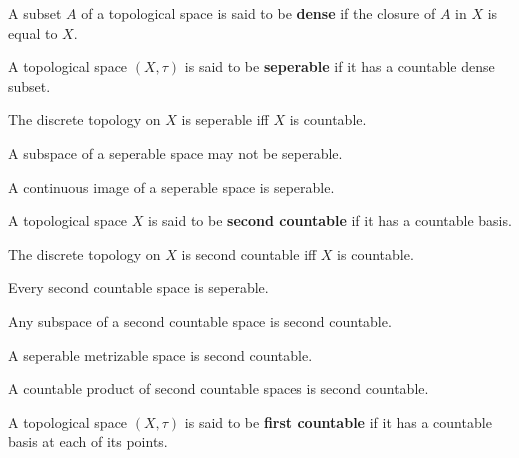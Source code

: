 \begin{defn}
    A subset $A$ of a topological space is said to be \textbf{dense} if the closure of $A$ in $X$ is equal to $X$.
\end{defn}

\begin{defn}
    A topological space $(X, \tau)$ is said to be \textbf{seperable} if it has a countable dense subset.
\end{defn}

\begin{note}
    The discrete topology on $X$ is seperable iff $X$ is countable.
\end{note}

\begin{note}
    A subspace of a seperable space may not be seperable.
\end{note}

\begin{thm}
    A continuous image of a seperable space is seperable.
\end{thm}

\begin{defn}
    A topological space $X$ is said to be \textbf{second countable} if it has a countable basis.
\end{defn}

\begin{note}
    The discrete topology on $X$ is second countable iff $X$ is countable.
\end{note}

\begin{thm}
    Every second countable space is seperable.
\end{thm}

\begin{thm}
    Any subspace of a second countable space is second countable.
\end{thm}

\begin{thm}
    A seperable metrizable space is second countable.
\end{thm}

\begin{thm}
    A countable product of second countable spaces is second countable.
\end{thm}

\begin{defn}
    A topological space $(X, \tau)$ is said to be \textbf{first countable} if it has a countable basis at each of its points.
\end{defn}

